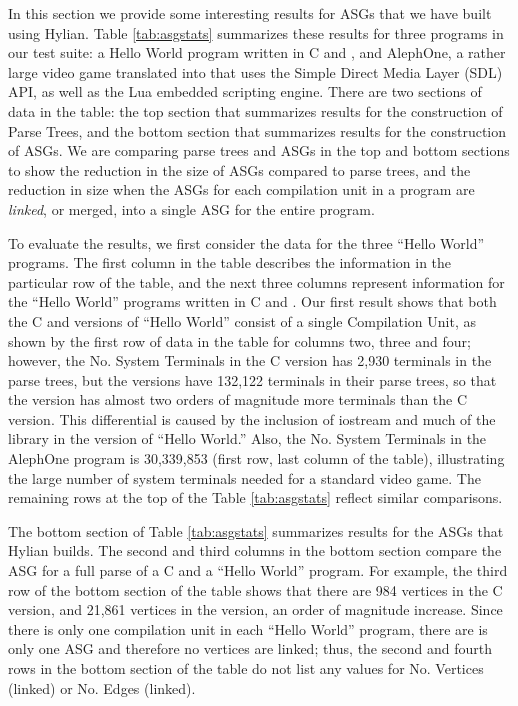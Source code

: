 



In this section we provide some interesting results for ASGs that 
we have built using Hylian.
Table \ref{tab:asgstats} summarizes these results for three
programs in our test suite: a {\sf Hello World} program written in
C and {\CPP}, and {\sf AlephOne}, a rather large
video game translated into {\CPP} that uses the
Simple Direct Media Layer (SDL) API, as well as the Lua
embedded scripting engine.
There are two sections of data in the table: the top section 
that summarizes results for the construction of {\sf Parse Trees}, 
and the bottom section that summarizes results for the construction
of ASGs. We are comparing parse trees and ASGs in the top and bottom
sections to show the reduction in the size of ASGs compared to parse
trees, and the reduction in size when the ASGs for each compilation 
unit in a program are {\em linked}, or merged,
into a single ASG for the entire program.


To evaluate the results, we first consider the data
for the three ``Hello World'' programs.
The first column in the table describes the information in the particular
row of the table, and the next three columns represent information
for the ``Hello World'' programs written in C and {\CPP}.
Our first result shows that both the C and {\CPP}
versions of ``Hello World'' consist of a single {\sf Compilation Unit},
as shown by the first row of data in the table for columns two, three
and four; however, the {\sf No. System Terminals} in the C version has
2,930 terminals in the parse trees, but the {\CPP} versions have 132,122
terminals in their parse trees, so that the {\CPP} version has almost
two orders of magnitude more terminals than the C version. This
differential is caused by the inclusion of {\sf iostream} and much
of the {\CPP} library in the {\CPP} version of ``Hello World.''
Also, the {\sf No. System Terminals} in the {\sf AlephOne} program
is 30,339,853 (first row, last column of the table), 
illustrating the large number of system terminals
needed for a standard video game. The remaining rows at the top
of the Table \ref{tab:asgstats} reflect similar comparisons.

The bottom section of Table \ref{tab:asgstats} summarizes results
for the ASGs that Hylian builds. The second and third columns in
the bottom section compare the ASG for a full parse of a C and
a {\CPP} ``Hello World'' program. For example, the third row of
the bottom section of the table shows that there are 984 vertices
in the C version, and 21,861 vertices in the {\CPP} version, an
order of magnitude increase. Since there is only one compilation
unit in each ``Hello World'' program, there are is only one ASG
and therefore no vertices are linked; thus, the second and fourth
rows in the bottom section of the table do not list any values
for {\sf No. Vertices (linked)} or {\sf No. Edges (linked)}.


